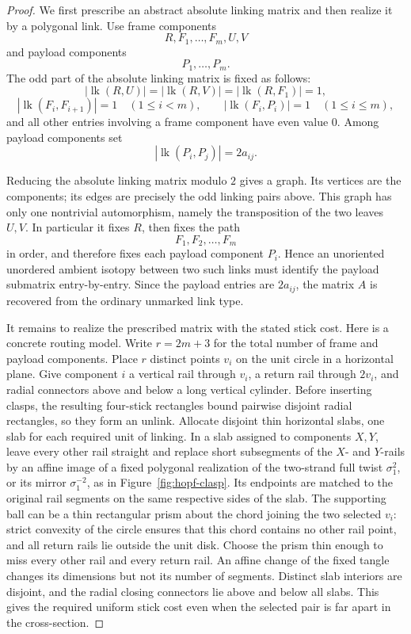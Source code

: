 \documentclass[11pt]{article}
\theoremstyle{remark}
\theoremstyle{plain}
\begin{document}
\begin{proof}
We first prescribe an abstract absolute linking matrix and then realize it by a
polygonal link.  Use frame components
\[
    R,F_1,\ldots,F_m,U,V
\]
and payload components
\[
    P_1,\ldots,P_m.
\]
The odd part of the absolute linking matrix is fixed as follows:
\[
    |\operatorname{lk}(R,U)|
    =
    |\operatorname{lk}(R,V)|
    =
    |\operatorname{lk}(R,F_1)|
    =
    1,
\]
\[
    |\operatorname{lk}(F_i,F_{i+1})|=1\quad(1\le i<m),
    \qquad
    |\operatorname{lk}(F_i,P_i)|=1\quad(1\le i\le m),
\]
and all other entries involving a frame component have even value \(0\).  Among
payload components set
\[
    |\operatorname{lk}(P_i,P_j)|=2a_{ij}.
\]

Reducing the absolute linking matrix modulo \(2\) gives a graph.  Its vertices
are the components; its edges are precisely the odd linking pairs above.  This
graph has only one nontrivial automorphism, namely the transposition of the two
leaves \(U,V\).  In particular it fixes \(R\), then fixes the path
\[
    F_1,F_2,\ldots,F_m
\]
in order, and therefore fixes each payload component \(P_i\).  Hence an
unoriented unordered ambient isotopy between two such links must identify the
payload submatrix entry-by-entry.  Since the payload entries are \(2a_{ij}\),
the matrix \(A\) is recovered from the ordinary unmarked link type.

It remains to realize the prescribed matrix with the stated stick cost.  Here
is a concrete routing model.  Write \(r=2m+3\) for the total number of frame
and payload components.  Place \(r\) distinct points \(v_i\) on the unit
circle in a horizontal plane.  Give component \(i\) a vertical rail through
\(v_i\), a return rail through \(2v_i\), and radial connectors above and
below a long vertical cylinder.  Before inserting clasps, the resulting
four-stick rectangles bound pairwise disjoint radial rectangles, so they
form an unlink.  Allocate disjoint thin horizontal slabs, one slab
for each required unit of linking.  In a slab assigned to components \(X,Y\),
leave every other rail straight and replace short subsegments of the \(X\)-
and \(Y\)-rails by an affine image of a fixed polygonal realization of the two-strand full twist
\(\sigma_1^2\), or its mirror \(\sigma_1^{-2}\), as in
Figure~\ref{fig:hopf-clasp}.  Its endpoints are matched to the original rail
segments on the same respective sides of the slab.  The supporting ball can
be a thin rectangular prism about the chord joining the two selected
\(v_i\): strict convexity of the circle ensures that this chord contains no
other rail point, and all return rails lie outside the unit disk.  Choose the
prism thin enough to miss every other rail and every return rail.  An affine
change of the fixed tangle changes its dimensions but not its number of
segments.  Distinct slab interiors are disjoint, and the radial closing
connectors lie above and below all slabs.  This gives the required uniform
stick cost even when the selected pair is far apart in the cross-section.


\end{proof}
\end{document}
